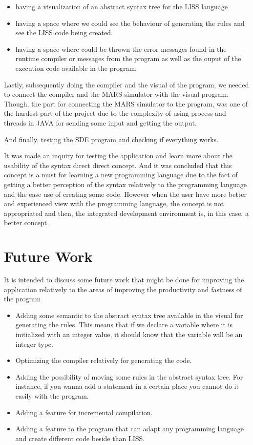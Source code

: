 \documentclass[
  oneside,
  11pt, a4paper,
  footinclude=true,
  headinclude=true,
  cleardoublepage=empty
]{scrbook}
\begin{document}
\begin{itemize}
\item having a visualization of an abstract syntax tree for the LISS language
\item having a space where we could see the behaviour of generating the rules and see the LISS code being created.
\item having a space where could be thrown the error messages found in the runtime compiler or messages from the program as well as the ouput of the execution code available in the program.
\end{itemize}

Lastly, subsequently doing the compiler and the visual of the program, we needed to connect the compiler and the MARS simulator with the visual program. Though, the part for connecting the MARS simulator to the program, was one of the hardest part of the project due to the complexity of using process and threads in JAVA for sending some input and getting the output.

And finally, testing the SDE program and checking if everything works.

It was made an inquiry for testing the application and learn more about the usability of the syntax direct direct concept. And it was concluded that this concept is a must for learning a new programming language due to the fact of getting a better perception of the syntax relatively to the programming language and the ease use of creating some code. However when the user have more better and experienced view with the programming language, the concept is not appropriated and then, the integrated development environment is, in this case, a better concept.

\section{Future Work}

It is intended to discuss some future work that might be done for improving the application relatively to the areas of improving the productivity and fastness of the program

\begin{itemize}
\item Adding some semantic to the abstract syntax tree available in the visual for generating the rules. This means that if we declare a variable where it is initialized with an integer value, it should know that the variable will be an integer type.
\item Optimizing the compiler relatively for generating the code.
\item Adding the possibility of moving some rules in the abstract syntax tree. For instance, if you wanna add a statement in a certain place you cannot do it easily with the program.
\item Adding a feature for incremental compilation.
\item Adding a feature to the program that can adapt any programming language and create different code beside than LISS.
\end{itemize}
\end{document}
